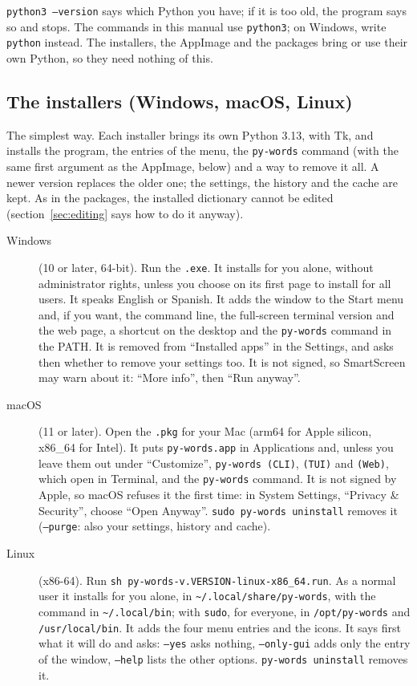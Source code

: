 \documentclass[12pt,
              article,
              oneside
              ]{memoir}
\begin{document}
\noindent
\texttt{python3 --version} says which Python you have; if it is too old,
the program says so and stops. The commands in this manual use
\texttt{python3}; on Windows, write \texttt{python} instead. The
installers, the AppImage and the packages bring or use their own Python,
so they need nothing of this.

\subsection{The installers (Windows, macOS, Linux)}
\label{sec:installers}

%
The simplest way. Each installer brings its own Python 3.13, with Tk, and
installs the program, the entries of the menu, the \texttt{py-words}
command (with the same first argument as the AppImage, below) and a way
to remove it all. A newer version replaces the older one; the settings,
the history and the cache are kept. As in the packages, the installed
dictionary cannot be edited (section~\ref{sec:editing} says how to do it
anyway).

\begin{description}
\item[Windows] (10 or later, 64-bit). Run the \texttt{.exe}. It installs
  for you alone, without administrator rights, unless you choose on its
  first page to install for all users. It speaks English or Spanish. It
  adds the window to the Start menu and, if you want, the command line,
  the full-screen terminal version and the web page, a shortcut on the
  desktop and the \texttt{py-words} command in the PATH. It is removed
  from ``Installed apps'' in the Settings, and asks then whether to remove
  your settings too. It is not signed, so SmartScreen may warn about it:
  ``More info'', then ``Run anyway''.
\item[macOS] (11 or later). Open the \texttt{.pkg} for your Mac (arm64
  for Apple silicon, x86\_64 for Intel). It puts \texttt{py-words.app} in
  Applications and, unless you leave them out under ``Customize'',
  \texttt{py-words (CLI)}, \texttt{(TUI)} and \texttt{(Web)}, which open in
  Terminal, and the \texttt{py-words} command. It is not signed by Apple,
  so macOS refuses it the first time: in System Settings, ``Privacy \&
  Security'', choose ``Open Anyway''. \texttt{sudo py-words uninstall}
  removes it (\texttt{--purge}: also your settings, history and cache).
\item[Linux] (x86-64). Run \texttt{sh py-words-v.VERSION-linux-x86\_64.run}.
  As a normal user it installs for you alone, in
  \texttt{\textasciitilde/.local/share/py-words}, with the command in
  \texttt{\textasciitilde/.local/bin}; with \texttt{sudo}, for everyone, in
  \texttt{/opt/py-words} and \texttt{/usr/local/bin}. It adds the four
  menu entries and the icons. It says first what it will do and asks:
  \texttt{--yes} asks nothing, \texttt{--only-gui} adds only the entry of
  the window, \texttt{--help} lists the other options.
  \texttt{py-words uninstall} removes it.
\end{description}
\end{document}
